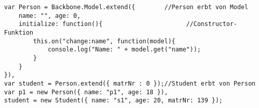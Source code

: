 \begin{lstlisting}
var Person = Backbone.Model.extend({        //Person erbt von Model
	name: "", age: 0,
	initialize: function(){                       //Constructor-Funktion
		this.on("change:name", function(model){ 
			console.log("Name: " + model.get("name")); 
		}
	}
}),
var student = Person.extend({ matrNr : 0 });//Student erbt von Person
var p1 = new Person({ name: "p1", age: 18 }),
student = new Student({ name: "s1", age: 20, matrNr: 139 });
\end{lstlisting}